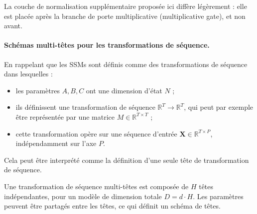 La couche de normalisation supplémentaire proposée ici diffère légèrement : elle est placée après la branche de porte multiplicative (multiplicative gate), et non avant.

\paragraph{Schémas multi-têtes pour les transformations de séquence.} En rappelant  que les SSMs sont définis comme des transformations de séquence dans lesquelles :
\begin{itemize}
    \item les paramètres $A, B, C$ ont une dimension d'état $N$ ;
    \item ils définissent une transformation de séquence $\mathbb{R}^T \rightarrow \mathbb{R}^T$, qui peut par exemple être représentée par une matrice $M \in \mathbb{R}^{T \times T}$ ;
    \item cette transformation opère sur une séquence d'entrée $\mathbf{X} \in \mathbb{R}^{T \times P}$, indépendamment sur l'axe $P$.
\end{itemize}

\newpage

Cela peut être interprété comme la définition d'une seule tête de transformation de séquence.

\begin{definition} Une transformation de séquence multi-têtes est composée de $H$ têtes indépendantes, pour un modèle de dimension totale $D = d \cdot H$. Les paramètres peuvent être partagés entre les têtes, ce qui définit un schéma de têtes.
\end{definition}

